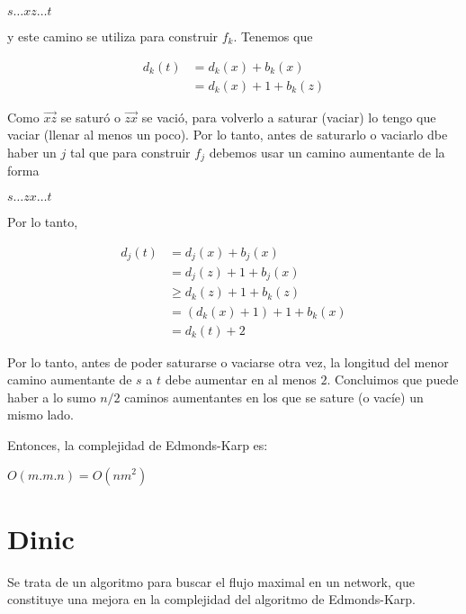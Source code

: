 \documentclass[10pt,a4paper]{article}
\begin{document}
\begin{center}
$s\dots xz\dots t$
\end{center}

y este camino se utiliza para construir $f_k$. Tenemos que

\begin{center}
\begin{align*} d_k(t) &= d_k(x) + b_k(x)\\ &= d_k(x)+1+b_k(z) \end{align*}
\end{center}

Como $\overrightarrow{xz}$ se saturó o $\overrightarrow{zx}$ se vació, para volverlo a saturar (vaciar) lo tengo que vaciar (llenar al menos un poco). Por lo tanto, antes de saturarlo o vaciarlo dbe haber un $j$ tal que para construir $f_j$ debemos usar un camino aumentante de la forma

\begin{center}
$s\dots zx\dots t$
\end{center}

Por lo tanto,

\begin{center}
\begin{align*} d_j(t) &= d_j(x) + b_j(x)\\ &= d_j(z)+1+b_j(x)\\ &\geq d_k(z) + 1 + b_k(z)\\ &= (d_k(x)+1) + 1 + b_k(x)\\ &= d_k(t) + 2 \end{align*}
\end{center}

Por lo tanto, antes de poder saturarse o vaciarse otra vez, la longitud del menor camino aumentante de $s$ a $t$ debe aumentar en al menos $2$. Concluimos que puede haber a lo sumo $n/2$ caminos aumentantes en los que se sature (o vacíe) un mismo lado.

Entonces, la complejidad de Edmonds-Karp es:

\begin{center}
$O(m.m.n)=O(nm^2)$
\end{center}

\section*{Dinic}

Se trata de un algoritmo para buscar el flujo maximal en un network, que constituye una mejora en la complejidad del algoritmo de Edmonds-Karp.
\end{document}
